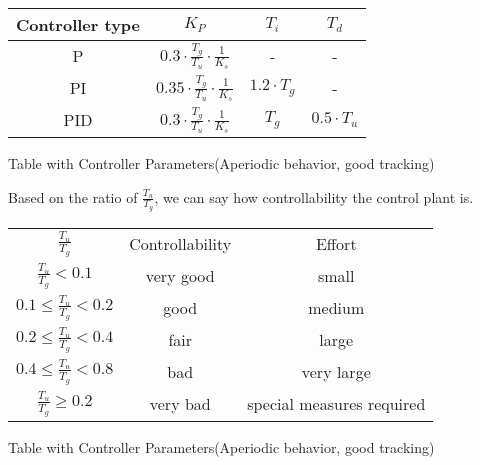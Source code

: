 \begin{center}
    \begin{threeparttable}
        \begin{tabular}{cccc}
            \toprule
            Controller type & $K_{P}$ & $T_{i}$ & $T_{d}$ \\
            \midrule
            P    &  $0.3  \cdot\frac{T_{g}}{T_{u}} \cdot \frac{1}{K_{s}}$  &  -                  &  -                  \\
            PI   &  $0.35 \cdot\frac{T_{g}}{T_{u}} \cdot \frac{1}{K_{s}}$  &  $1.2 \cdot T_{g}$  &  -                  \\
            PID  &  $0.3  \cdot\frac{T_{g}}{T_{u}} \cdot \frac{1}{K_{s}}$  &  $T_{g}$            &  $0.5 \cdot T_{u}$  \\
            \bottomrule
        \end{tabular}
        \caption{Table with Controller Parameters(Aperiodic behavior, good tracking)}
        \label{tab:chien_hrones_reswick}
    \end{threeparttable}
\end{center}

Based on the ratio of $\frac{T_{u}}{T_{g}}$,  we  can  say how controllability
the control plant is.

\begin{center}
    \begin{threeparttable}
        \begin{tabular}{ccc}
            \toprule
            $\frac{T_{u}}{T_{g}}$                 &  Controllability  & Effort \\
            $\frac{T_{u}}{T_{g}} < 0.1$           &  very good        & small  \\ 
            $0.1 \leq \frac{T_{u}}{T_{g}} < 0.2$  &  good             & medium  \\ 
            $0.2 \leq \frac{T_{u}}{T_{g}} < 0.4$  &  fair             & large  \\ 
            $0.4 \leq \frac{T_{u}}{T_{g}} < 0.8$  &  bad              & very large  \\ 
            $ \frac{T_{u}}{T_{g}} \geq 0.2$       &  very bad         & special measures required  \\ 
        \end{tabular}
        \caption{Table with Controller Parameters(Aperiodic behavior, good tracking)}
        \label{tab:controllability}
    \end{threeparttable}
\end{center}

